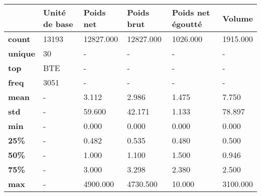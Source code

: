 \begin{tabularx}{\linewidth}{lXXXXX}
\toprule
{} & Unité de base &  Poids net &  Poids brut &  Poids net égoutté &    Volume \\
\midrule
\textbf{count } &         13193 &  12827.000 &   12827.000 &           1026.000 &  1915.000 \\
\textbf{unique} &            30 &          - &           - &                  - &         - \\
\textbf{top   } &           BTE &          - &           - &                  - &         - \\
\textbf{freq  } &          3051 &          - &           - &                  - &         - \\
\textbf{mean  } &             - &      3.112 &       2.986 &              1.475 &     7.750 \\
\textbf{std   } &             - &     59.600 &      42.171 &              1.133 &    78.897 \\
\textbf{min   } &             - &      0.000 &       0.000 &              0.000 &     0.000 \\
\textbf{25\%   } &             - &      0.482 &       0.535 &              0.480 &     0.500 \\
\textbf{50\%   } &             - &      1.000 &       1.100 &              1.500 &     0.946 \\
\textbf{75\%   } &             - &      3.000 &       3.298 &              2.380 &     2.500 \\
\textbf{max   } &             - &   4900.000 &    4730.500 &             10.000 &  3100.000 \\
\bottomrule
\end{tabularx}
